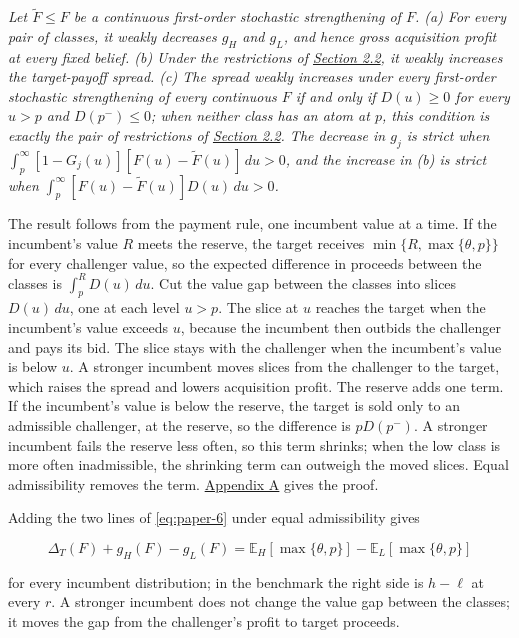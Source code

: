 \emph{Let \(\tilde F\le F\) be a continuous first-order stochastic
strengthening of \(F\). (a) For every pair of classes, it weakly
decreases \(g_H\) and \(g_L\), and hence gross acquisition profit at
every fixed belief. (b) Under the restrictions of
\hyperref[sec-values-preparation-and-the-sale]{Section 2.2}, it weakly
increases the target-payoff spread. (c) The spread weakly increases
under every first-order stochastic strengthening of every continuous
\(F\) if and only if \(D(u)\ge0\) for every \(u>p\) and
\(D(p^-)\le0\); when neither class has an atom at \(p\), this condition
is exactly the pair of restrictions of
\hyperref[sec-values-preparation-and-the-sale]{Section 2.2}. The
decrease in \(g_j\) is strict when
\(\int_p^\infty[1-G_j(u)][F(u)-\tilde F(u)]\,du>0\), and the increase
in (b) is strict when \(\int_p^\infty[F(u)-\tilde F(u)]D(u)\,du>0\).}

The result follows from the payment rule, one incumbent value at a time.
If the incumbent's value \(R\) meets the reserve, the target receives
\(\min\{R,\max\{\theta,p\}\}\) for every challenger value, so the
expected difference in proceeds between the classes is
\(\int_p^RD(u)\,du\). Cut the value gap between the classes into slices
\(D(u)\,du\), one at each level \(u>p\). The slice at \(u\) reaches the
target when the incumbent's value exceeds \(u\), because the incumbent
then outbids the challenger and pays its bid. The slice stays with the
challenger when the incumbent's value is below \(u\). A stronger
incumbent moves slices from the challenger to the target, which raises
the spread and lowers acquisition profit. The reserve adds one term. If
the incumbent's value is below the reserve, the target is sold only to
an admissible challenger, at the reserve, so the difference is
\(pD(p^-)\). A stronger incumbent fails the reserve less often, so this
term shrinks; when the low class is more often inadmissible, the
shrinking term can outweigh the moved slices. Equal admissibility
removes the term. \hyperref[paper-appendix]{Appendix A} gives the proof.

Adding the two lines of \eqref{eq:paper-6} under equal admissibility
gives

\[
\Delta_T(F)+g_H(F)-g_L(F)
=\mathbb E_H[\max\{\theta,p\}]-\mathbb E_L[\max\{\theta,p\}]
\]

for every incumbent distribution; in the benchmark the right side is
\(h-\ell\) at every \(r\). A stronger incumbent does not change the
value gap between the classes; it moves the gap from the challenger's
profit to target proceeds.

